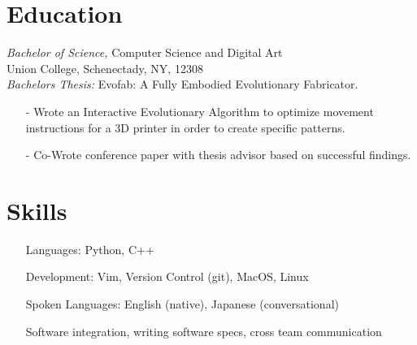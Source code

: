 \documentclass[margin, 10pt]{res} %
\begin{document}
\begin{resume}

 



\section{Education}

{\sl Bachelor of Science,} Computer Science and Digital Art \\
Union College, Schenectady, NY, 12308 \\
{\sl Bachelors Thesis:} Evofab: A Fully Embodied Evolutionary Fabricator.
\begin{itemize} \itemsep -2pt
\item[-] Wrote an Interactive Evolutionary Algorithm to optimize movement instructions for a 3D printer in order to create specific patterns.
\item[-] Co-Wrote conference paper with thesis advisor based on successful findings.
\end{itemize}
 

\section{Skills} 

\begin{itemize} \itemsep -2pt
\setlength{\itemindent}{-25pt}
\item[] Languages: Python, C++
\item[] Development: Vim, Version Control (git), MacOS, Linux
\item[] Spoken Languages: English (native), Japanese (conversational)
\item[] Software integration, writing software specs, cross team communication
\end{itemize}


\end{resume}
\end{document}
